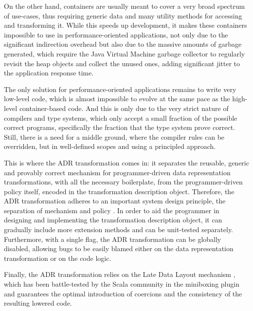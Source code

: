 On the other hand, containers are usually meant to cover a very broad spectrum of use-cases, thus requiring generic data and many utility methods for accessing and transforming it. While this speeds up development, it makes these containers impossible to use in performance-oriented applications, not only due to the significant indirection overhead but also due to the massive amounts of garbage generated, which require the Java Virtual Machine garbage collector to regularly revisit the heap objects and collect the unused ones, adding significant jitter to the application response time.

The only solution for performance-oriented applications remains to write very low-level code, which is almost impossible to evolve at the same pace as the high-level container-based code. And this is only due to the very strict nature of compilers and type systems, which only accept a small fraction of the possible correct programs, specifically the fraction that the type system prove correct. Still, there is a need for a middle ground, where the compiler rules can be overridden, but in well-defined scopes and using a principled approach. %

This is where the ADR transformation comes in: it separates the reusable, generic and provably correct mechanism for programmer-driven data representation transformations, with all the necessary boilerplate, from the programmer-driven policy itself, encoded in the transformation description object. Therefore, the ADR transformation adheres to an important system design principle, the separation of mechanism and policy \cite{lampson-mechanism-policy}. In order to aid the programmer in designing and implementing the transformation description object, it can gradually include more extension methods and can be unit-tested separately. Furthermore, with a single flag, the ADR transformation can be globally disabled, allowing bugs to be easily blamed either on the data representation transformation or on the code logic.

Finally, the ADR transformation relies on the Late Data Layout mechanism \cite{ldl,ldl-www}, which has been battle-tested by the Scala community in the miniboxing plugin \cite{miniboxing,miniboxing-www} and guarantees the optimal introduction of coercions and the consistency of the resulting lowered code.
